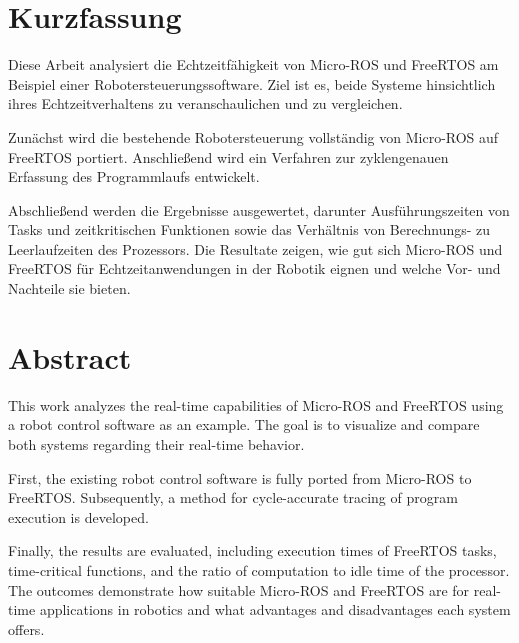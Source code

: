 \section*{Kurzfassung}

Diese Arbeit analysiert die Echtzeitfähigkeit von Micro-ROS und FreeRTOS am
Beispiel einer Robotersteuerungssoftware. Ziel ist es, beide Systeme
hinsichtlich ihres Echtzeitverhaltens zu veranschaulichen und zu vergleichen.

Zunächst wird die bestehende Robotersteuerung vollständig von Micro-ROS auf
FreeRTOS portiert. Anschließend wird ein Verfahren zur zyklengenauen Erfassung
des Programmlaufs entwickelt.

Abschließend werden die Ergebnisse ausgewertet, darunter Ausführungszeiten von
Tasks und zeitkritischen Funktionen sowie das Verhältnis von Berechnungs- zu
Leerlaufzeiten des Prozessors. Die Resultate zeigen, wie gut sich Micro-ROS und
FreeRTOS für Echtzeitanwendungen in der Robotik eignen und welche Vor- und
Nachteile sie bieten.

\section*{Abstract}

This work analyzes the real-time capabilities of Micro-ROS and FreeRTOS using a
robot control software as an example. The goal is to visualize and compare both
systems regarding their real-time behavior.

First, the existing robot control software is fully ported from Micro-ROS to
FreeRTOS. Subsequently, a method for cycle-accurate tracing of program execution
is developed.

Finally, the results are evaluated, including execution times of FreeRTOS tasks,
time-critical functions, and the ratio of computation to idle time of the
processor. The outcomes demonstrate how suitable Micro-ROS and FreeRTOS are for
real-time applications in robotics and what advantages and disadvantages each
system offers.
